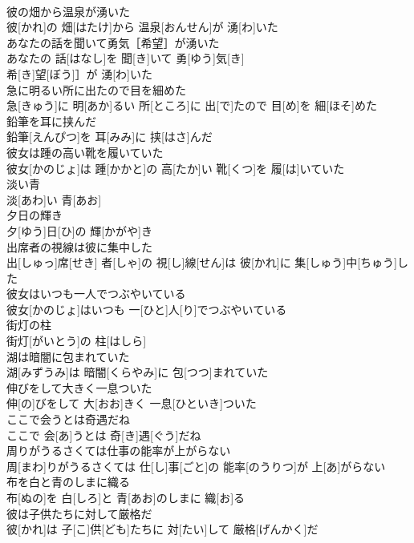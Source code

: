 \documentclass[8pt]{extreport}
\begin{document}
\begin{CJK}{UTF8}{min}
\\	彼の畑から温泉が湧いた	
\\	彼[かれ]の 畑[はたけ]から 温泉[おんせん]が 湧[わ]いた
\\	あなたの話を聞いて勇気［希望］が湧いた	
\\	あなたの 話[はなし]を 聞[き]いて 勇[ゆう]気[き]
\\	希[き]望[ぼう]］が 湧[わ]いた
\\	急に明るい所に出たので目を細めた	
\\	急[きゅう]に 明[あか]るい 所[ところ]に 出[で]たので 目[め]を 細[ほそ]めた
\\	鉛筆を耳に挟んだ	
\\	鉛筆[えんぴつ]を 耳[みみ]に 挟[はさ]んだ
\\	彼女は踵の高い靴を履いていた	
\\	彼女[かのじょ]は 踵[かかと]の 高[たか]い 靴[くつ]を 履[は]いていた
\\	淡い青	
\\	淡[あわ]い 青[あお]
\\	夕日の輝き	
\\	夕[ゆう]日[ひ]の 輝[かがや]き
\\	出席者の視線は彼に集中した	
\\	出[しゅっ]席[せき] 者[しゃ]の 視[し]線[せん]は 彼[かれ]に 集[しゅう]中[ちゅう]した
\\	彼女はいつも一人でつぶやいている	
\\	彼女[かのじょ]はいつも 一[ひと]人[り]でつぶやいている
\\	街灯の柱	
\\	街灯[がいとう]の 柱[はしら]
\\	湖は暗闇に包まれていた	
\\	湖[みずうみ]は 暗闇[くらやみ]に 包[つつ]まれていた
\\	伸びをして大きく一息ついた	
\\	伸[の]びをして 大[おお]きく 一息[ひといき]ついた
\\	ここで会うとは奇遇だね	
\\	ここで 会[あ]うとは 奇[き]遇[ぐう]だね
\\	周りがうるさくては仕事の能率が上がらない	
\\	周[まわ]りがうるさくては 仕[し]事[ごと]の 能率[のうりつ]が 上[あ]がらない
\\	布を白と青のしまに織る	
\\	布[ぬの]を 白[しろ]と 青[あお]のしまに 織[お]る
\\	彼は子供たちに対して厳格だ	
\\	彼[かれ]は 子[こ]供[ども]たちに 対[たい]して 厳格[げんかく]だ

\end{CJK}
\end{document}

